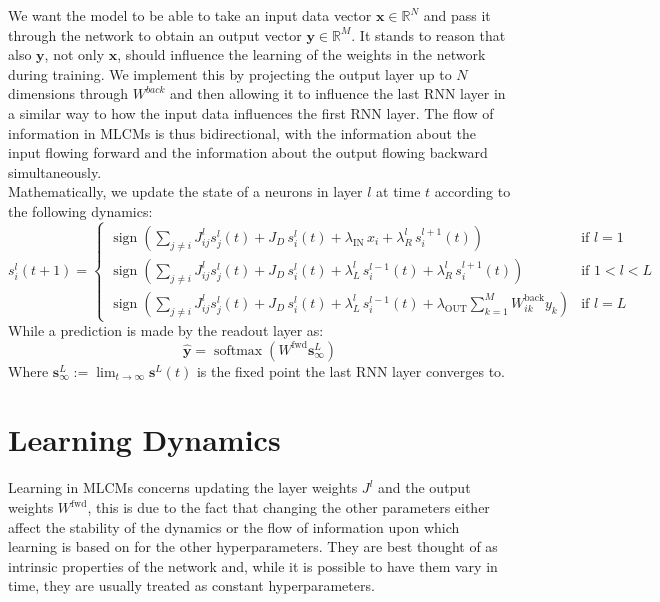 \documentclass[a4paper,12pt]{report}
\begin{document}
We want the model to be able to take an input data vector $\mathbf{x} \in \mathbb{R}^N$ 
and pass it through the network to obtain an output vector $\mathbf{y} \in 
\mathbb{R}^M$. It stands to reason that also $\mathbf{y}$, not only $\mathbf{x}$, 
should influence the learning of the weights in the network during training. We 
implement this by projecting the output layer up to $N$ dimensions through $W^{back}$ and then allowing 
it to influence the last RNN layer in a similar way to how the input data influences 
the first RNN layer. The flow of information in MLCMs is thus bidirectional, with 
the information about the input flowing forward and the information about the output 
flowing backward simultaneously. \\
Mathematically, we update the state of a neurons in layer $l$ at time $t$ according to the
following dynamics:
\begin{equation}
    s_i^l(t+1) = 
    \begin{cases}
        \operatorname{sign}\left(\displaystyle\sum_{j \neq i} J_{ij}^l s_j^l(t) + 
        J_D\, s_i^l(t) + \lambda_{\mathrm{IN}}\, x_i + \lambda_R^l\, s_i^{l+1}(t)
        \right) & \text{if } l = 1 \\[2ex]
        \operatorname{sign}\left(\displaystyle\sum_{j \neq i} J_{ij}^l s_j^l(t) + 
        J_D\, s_i^l(t) + \lambda_L^l\, s_i^{l-1}(t) + \lambda_R^l\, s_i^{l+1}(t)
        \right) & \text{if } 1 < l < L \\[2ex]
        \operatorname{sign}\left(\displaystyle\sum_{j \neq i} J_{ij}^l s_j^l(t) + 
        J_D\, s_i^l(t) + \lambda_L^l\, s_i^{l-1}(t) + \lambda_{\mathrm{OUT}} 
        \sum_{k=1}^{M} W_{ik}^{\mathrm{back}} y_k\right) & \text{if } l = L
    \end{cases}
    \label{eq:si_update}
\end{equation}
While a prediction is made by the readout layer as:
\begin{equation}
    \hat{\mathbf{y}} = \operatorname{softmax}\left(W^{\mathrm{fwd}} \mathbf{s}^{L}_{\infty}\right)
    \label{eq:yk_update}
\end{equation}
Where $\mathbf{s}^{L}_{\infty} := \lim_{t\to\infty} \mathbf{s}^{L}(t)$ is the fixed 
point the last RNN layer converges to.

\section{Learning Dynamics}
Learning in MLCMs concerns updating the layer weights $J^l$ and the output
weights $W^{\mathrm{fwd}}$, this is due to the fact that changing the other 
parameters either affect the stability of the dynamics or the flow of information 
upon which learning is based on for the other hyperparameters. They are best thought 
of as intrinsic properties of the network and, while it is possible to have them vary 
in time, they are usually treated as constant hyperparameters.
\vspace{0.5em}
\end{document}
